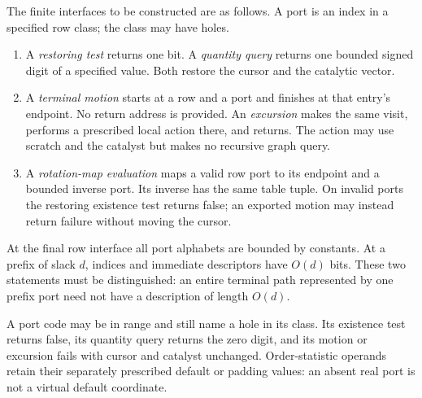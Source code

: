 The finite interfaces to be constructed are as follows.  A port is an
index in a specified row class; the class may have holes.
\begin{enumerate}
\item A \emph{restoring test} returns one bit.  A \emph{quantity query}
  returns one bounded signed digit of a specified value.  Both restore
  the cursor and the catalytic vector.
\item A \emph{terminal motion} starts at a row and a port and finishes at
  that entry's endpoint.  No return address is provided.  An
  \emph{excursion} makes the same visit, performs a prescribed local
  action there, and returns.  The action may use scratch and the catalyst
  but makes no recursive graph query.
\item A \emph{rotation-map evaluation} maps a valid row port to its endpoint and a
  bounded inverse port.  Its inverse has the same table tuple.  On
  invalid ports the restoring existence test returns false; an exported
  motion may instead return failure without moving the cursor.
\end{enumerate}
At the final row interface all port alphabets are bounded by constants.
At a prefix of slack $d$, indices and immediate descriptors have $O(d)$
bits.  These two statements must be distinguished: an entire terminal
path represented by one prefix port need not have a description of
length $O(d)$.

A port code may be in range and still name a hole in its class.  Its
existence test returns false, its quantity query returns the zero digit,
and its motion or excursion fails with cursor and catalyst unchanged.
Order-statistic operands retain their separately prescribed default or padding
values: an absent real port is not a virtual default coordinate.

